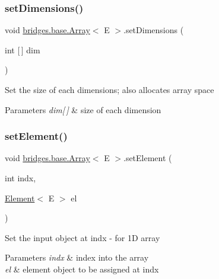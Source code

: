 \subsubsection{\texorpdfstring{setDimensions()}{setDimensions()}}
{\footnotesize\ttfamily void \mbox{\hyperlink{classbridges_1_1base_1_1_array}{bridges.\+base.\+Array}}$<$ E $>$.set\+Dimensions (\begin{DoxyParamCaption}\item[{int \mbox{[}$\,$\mbox{]}}]{dim }\end{DoxyParamCaption})}

Set the size of each dimensions; also allocates array space


\begin{DoxyParams}{Parameters}
{\em dim\mbox{[}$\,$\mbox{]}} & size of each dimension \\
\hline
\end{DoxyParams}
\mbox{\label{classbridges_1_1base_1_1_array_aafde1304d602e8b0f673dd61bc00c18f}} 
\subsubsection{\texorpdfstring{setElement()}{setElement()}\hspace{0.1cm}{\footnotesize\ttfamily [1/3]}}
{\footnotesize\ttfamily void \mbox{\hyperlink{classbridges_1_1base_1_1_array}{bridges.\+base.\+Array}}$<$ E $>$.set\+Element (\begin{DoxyParamCaption}\item[{int}]{indx,  }\item[{\mbox{\hyperlink{classbridges_1_1base_1_1_element}{Element}}$<$ E $>$}]{el }\end{DoxyParamCaption})}

Set the input object at \textquotesingle{}indx\textquotesingle{} -\/ for 1D array


\begin{DoxyParams}{Parameters}
{\em indx} & index into the array \\
\hline
{\em el} & element object to be assigned at \textquotesingle{}indx\textquotesingle{} \\
\hline
\end{DoxyParams}
\mbox{\label{classbridges_1_1base_1_1_array_a5e43e6d56cfeaf6a1b193b0ea16f7696}} 

